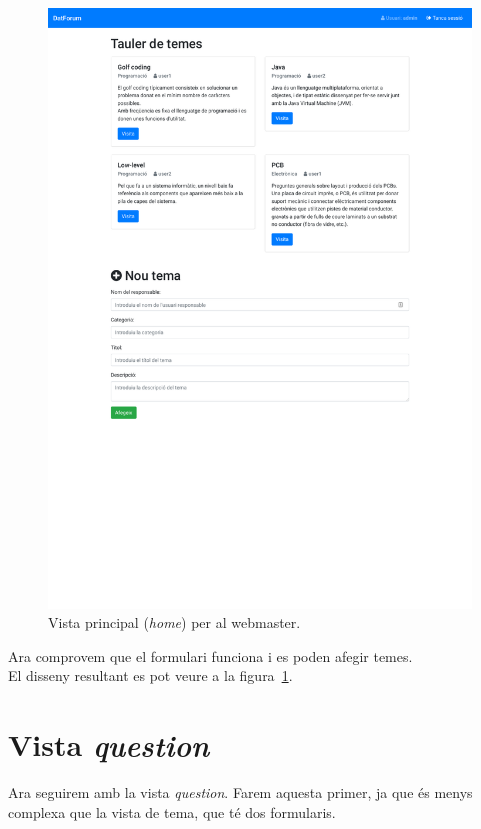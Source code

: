\documentclass[catalan, a4paper]{scrartcl}
\begin{document}
\begin{figure}
\centering \includegraphics[trim={0 8.2cm 0 0}, clip, width=.98\columnwidth, cframe=gray]{screens/home_admin.pdf}
\caption{\label{fig:home_admin} Vista principal (\emph{home}) per al webmaster. }
\end{figure}

Ara comprovem que el formulari funciona i es poden afegir temes.\\
El disseny resultant es pot veure a la figura~\ref{fig:home_admin}.



\clearpage
\section{Vista \emph{question}}

Ara seguirem amb la vista \emph{question}. Farem aquesta primer, ja que és
menys complexa que la vista de tema, que té dos formularis.
\end{document}
